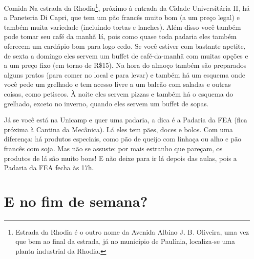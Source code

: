 \begin{story}{Comida}
Na estrada da Rhodia\footnote{Estrada da Rhodia é o outro nome da Avenida Albino J. B. Oliveira, uma vez que bem ao final da estrada, já no município de Paulínia, localiza-se uma planta industrial da Rhodia.}, próximo à entrada da Cidade Universitária II, há a Paneteria Di Capri, que tem um pão francês muito bom (a um preço legal) e também muita variedade (incluindo tortas e lanches). Além disso você também pode tomar seu café da manhã lá, pois como quase toda padaria eles também oferecem um cardápio bom para logo cedo. Se você estiver com bastante apetite, de sexta a domingo eles servem um buffet de café-da-manhã com muitas opções e a um preço fixo (em torno de R\$15). Na hora do almoço também são preparados alguns pratos (para comer no local e para levar) e também há um esquema onde você pede um grelhado e tem acesso livre a um balcão com saladas e outras coisas, como petiscos. À noite eles servem pizzas e também há o esquema do grelhado, exceto no inverno, quando eles servem um buffet de sopas.

Já se você está na Unicamp e quer uma padaria, a dica é a Padaria da FEA (fica próxima à Cantina da Mecânica). Lá eles tem pães, doces e bolos. Com uma diferença: há produtos especiais, como pão de queijo com linhaça ou alho e pão francês com soja. Mas não se assuste: por mais estranho que pareçam, os produtos de lá são muito bons! E não deixe para ir lá depois das aulas, pois a Padaria da FEA fecha às 17h.

\section*{E no fim de semana?}


\end{story}
